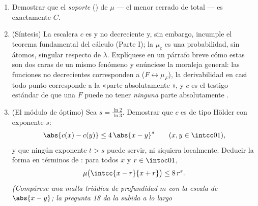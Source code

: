 \begin{problem}
\begin{enumerate}[resume]
  decir, de un punto aleatorio $X$ con ley $\mu$ (las integrales pueden
  tratarse como límites de sumas sobre las piezas de profundidad $m$,
  anticipando el~\cref{ch:b3:lebesgue}): la simetría da
  $\int x\,\dd\mu = \frac12$, y la autosemejanza da
        \[
        \int x^2\,\dd\mu = \frac38,
        \qquad\text{luego}\qquad
        \operatorname{Var}(X) = \frac18 .
        \]
        Compárese con la ley uniforme sobre $\intcc01$ (varianza
        $\frac1{12}$): la masa de Cantor, empujada hacia los bordes, se
        dispersa \emph{más}. \item Demostrar que el \emph{soporte}
        () de $\mu$ --- el
        menor cerrado de  total
        --- es exactamente $C$. \item (Síntesis) La escalera $c$ es
         y no decreciente
        y, sin embargo, incumple el teorema fundamental del cálculo
        (Parte I); la  $\mu_c$ es
        una probabilidad, sin átomos, singular respecto de $\lambda$.
        Explíquese en un párrafo breve cómo estas son dos caras de un
        mismo fenómeno y enúnciese la moraleja general: las funciones no
        decrecientes corresponden a
        ($F \leftrightarrow \mu_F$), la derivabilidad en casi todo punto
        corresponde a la «parte absolutamente
        », y $c$ es el
        testigo estándar de que una $F$
         puede no tener
        \emph{ninguna} parte absolutamente
        . \item (El módulo
        de  óptimo) Sea
        $s =
        \frac{\ln 2}{\ln 3}$. Demostrar que $c$ es
         de tipo Hölder con
        exponente $s$:
        \[
        \abs{c(x) - c(y)} \leq 4\,\abs{x - y}^{s}
        \qquad (x, y \in \intcc01),
        \]
        y que ningún exponente $t > s$ puede servir, ni siquiera
        localmente. Deducir la forma en términos de : para todos
        $x$ y $r \in \intoc01$,
        \[
        \mu\bigl(\intcc{x - r}{x + r}\bigr) \leq 8\,r^{s} .
        \]
        \emph{(Compárese una malla triádica de profundidad $m$ con la
        escala de $\abs{x - y}$; la pregunta 18 da la subida a lo largo
}
\end{enumerate}
\end{problem}

